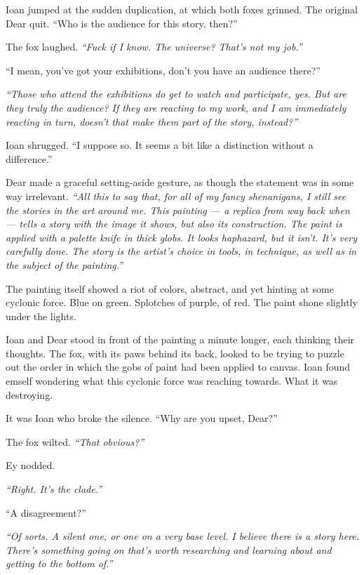 Ioan jumped at the sudden duplication, at which both foxes grinned. The original Dear quit. ``Who is the audience for this story, then?''

The fox laughed. \emph{``Fuck if I know. The universe? That's not my job.''}

``I mean, you've got your exhibitions, don't you have an audience there?''

\emph{``Those who attend the exhibitions do get to watch and participate, yes. But are they truly the audience? If they are reacting to my work, and I am immediately reacting in turn, doesn't that make them part of the story, instead?''}

Ioan shrugged. ``I suppose so. It seems a bit like a distinction without a difference.''

Dear made a graceful setting-aside gesture, as though the statement was in some way irrelevant. \emph{``All this to say that, for all of my fancy shenanigans, I still see the stories in the art around me. This painting — a replica from way back when — tells a story with the image it shows, but also its construction. The paint is applied with a palette knife in thick globs. It looks haphazard, but it isn't. It's very carefully done. The story is the artist's choice in tools, in technique, as well as in the subject of the painting.''}

The painting itself showed a riot of colors, abstract, and yet hinting at some cyclonic force. Blue on green. Splotches of purple, of red. The paint shone slightly under the lights.

Ioan and Dear stood in front of the painting a minute longer, each thinking their thoughts. The fox, with its paws behind its back, looked to be trying to puzzle out the order in which the gobs of paint had been applied to canvas. Ioan found emself wondering what this cyclonic force was reaching towards. What it was destroying.

It was Ioan who broke the silence. ``Why are you upset, Dear?''

The fox wilted. \emph{``That obvious?''}

Ey nodded.

\emph{``Right. It's the clade.''}

``A disagreement?''

\emph{``Of sorts. A silent one, or one on a very base level. I believe there is a story here. There's something going on that's worth researching and learning about and getting to the bottom of.''}

